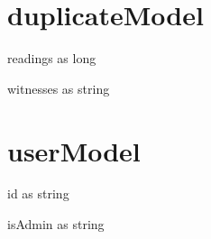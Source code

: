 \section{duplicateModel}
\begin{property}
readings as long
\end{property}
\begin{property}
witnesses as string
\end{property}
\section{userModel}
\begin{property}
id as string
\end{property}
\begin{property}
isAdmin as string
\end{property}
